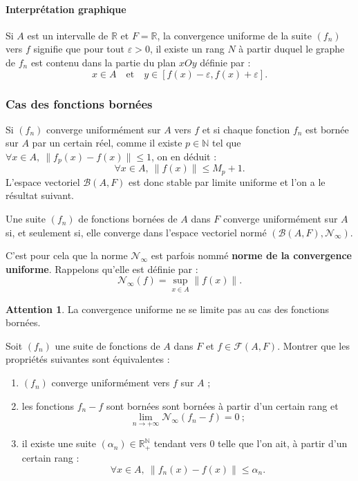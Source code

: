 \documentclass[french]{article}
\newcommand{\N}{\mathbb{N}}
\newcommand{\R}{\mathbb{R}}
\theoremstyle{plain}
\theoremstyle{definition}
\newtheorem*{attention}{Attention}
\theoremstyle{remark}
\begin{document}
\paragraph{Interprétation graphique} Si $A$ est un intervalle de $\R$ et $F=\R$, la convergence uniforme de la suite $(f_n)$ vers $f$ signifie que pour tout $\varepsilon>0$, il existe un rang $N$ à partir duquel le graphe de $f_n$ est contenu dans la partie du plan $xOy$ définie par :
$$x\in A\quad\text{et}\quad y\in[f(x)-\varepsilon,f(x)+\varepsilon].$$

\subsubsection*{Cas des fonctions bornées}

Si $(f_n)$ converge uniformément sur $A$ vers $f$ et si chaque fonction $f_n$ est bornée sur $A$ par un certain réel, comme il existe $p\in\N$ tel que $\forall x\in A,\ \lVert f_p(x)-f(x)\rVert\leqslant 1
$, on en déduit :
$$\forall x\in A,\ \lVert f(x)\rVert\leqslant M_p+1.$$
L'espace vectoriel $\mathcal{B}(A,F)$ est donc stable par limite uniforme et l'on a le résultat suivant.

\begin{prop}%
	Une suite $(f_n)$ de fonctions bornées de $A$ dans $F$ converge uniformément sur $A$ si, et seulement si, elle converge dans l'espace vectoriel normé $(\mathcal{B}(A,F),\mathcal{N}_\infty)$.
\end{prop}

C'est pour cela que la norme $\mathcal{N}_\infty$ est parfois nommé \textbf{norme de la convergence uniforme}. Rappelons qu'elle est définie par :
$$\mathcal{N}_\infty(f)=\underset{x\in A}{\sup}\lVert f(x)\rVert.$$

\begin{attention}
	La convergence uniforme ne se limite pas au cas des fonctions bornées.
\end{attention}

\begin{exo}
	Soit $(f_n)$ une suite de fonctions de $A$ dans $F$ et $f\in\mathcal{F}(A,F)$. Montrer que les propriétés suivantes sont équivalentes :
	\begin{enumerate}[label=(\roman*)]
		\item $(f_n)$ converge uniformément vers $f$ sur $A$ ;
		\item les fonctions $f_n-f$ sont bornées sont bornées à partir d'un certain rang et $$\underset{n\to+\infty}{\lim}\mathcal{N}_\infty(f_n-f)=0\ ;$$
		\item il existe une suite $(\alpha_n)\in\R_+^\N$ tendant vers $0$ telle que l'on ait, à partir d'un certain rang :
		$$\forall x\in A,\ \lVert f_n(x)-f(x)\rVert\leqslant\alpha_n.$$
	\end{enumerate}
\end{exo}
\end{document}

